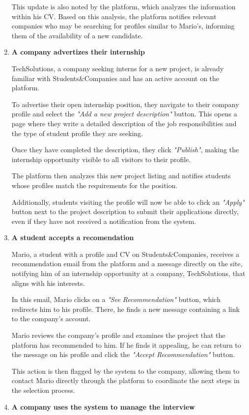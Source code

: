 \begin{enumerate}
    This update is also noted by the platform, which analyzes the information within his CV. Based on this analysis, the platform notifies relevant companies who may be searching for profiles similar to Mario's, informing them of the availability of a new candidate.
    \item \textbf{A company advertizes their internship}
    
    TechSolutions, a company seeking interns for a new project, is already familiar with Students\&Companies and has an active account on the platform.
    
    To advertise their open internship position, they navigate to their company profile and select the \textit{"Add a new project description" }button. This opens a page where they write a detailed description of the job responsibilities and the type of student profile they are seeking. 
    
    Once they have completed the description, they click \textit{"Publish"}, making the internship opportunity visible to all visitors to their profile.

    The platform then analyzes this new project listing and notifies students whose profiles match the requirements for the position. 
    
    
    Additionally, students visiting the profile will now be able to click an \textit{"Apply"} button next to the project description to submit their applications directly, even if they have not received a notification from the system.
    \item \textbf{A student accepts a recomendation}

    Mario, a student with a profile and CV on Students\&Companies, receives a recommendation email from the platform and a message directly on the site, notifying him of an internship opportunity at a company, TechSolutions, that aligns with his interests.
   
    In this email, Mario clicks on a \textit{"See Recommendation"} button, which redirects him to his profile. There, he finds a new message containing a link to the company’s account.

    Mario reviews the company’s profile and examines the project that the platform has recommended to him. If he finds it appealing, he can return to the message on his profile and click the \textit{"Accept Recommendation"} button.

    This action is then flagged by the system to the company, allowing them to contact Mario directly through the platform to coordinate the next steps in the selection process.
    \item \textbf{A company uses the system to manage the interview}


\end{enumerate}
